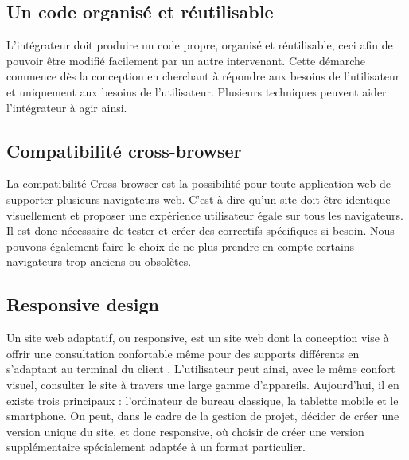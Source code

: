 \documentclass[a4paper, 12pt]{report}
\begin{document}
\subsection{Un code organisé et réutilisable}

L’intégrateur doit produire un code propre, organisé et réutilisable, ceci afin de pouvoir être modifié facilement par un autre intervenant. Cette démarche commence dès la conception en cherchant à répondre aux besoins de l’utilisateur et uniquement aux besoins de l’utilisateur. Plusieurs techniques peuvent aider l’intégrateur à agir ainsi.

\subsection{Compatibilité cross-browser}
La compatibilité Cross-browser est la possibilité pour toute application web de supporter plusieurs navigateurs web. C’est-à-dire qu’un site doit être identique visuellement et proposer une expérience utilisateur égale sur tous les navigateurs. Il est donc nécessaire de tester et créer des correctifs spécifiques si besoin. Nous pouvons également faire le choix de ne plus prendre en compte certains navigateurs trop anciens ou obsolètes.

\subsection{Responsive design}

Un site web adaptatif, ou responsive, est un site web dont la conception vise à offrir une consultation confortable même pour des supports différents en s’adaptant au terminal du client \cite{2}. L’utilisateur peut ainsi, avec le même confort visuel, consulter le site à travers une large gamme d’appareils. Aujourd’hui, il en existe trois principaux : l’ordinateur de bureau classique, la tablette mobile et le smartphone. On peut, dans le cadre de la gestion de projet, décider de créer une version unique du site, et donc responsive, où choisir de créer une version supplémentaire spécialement adaptée à un format particulier.
\end{document}
